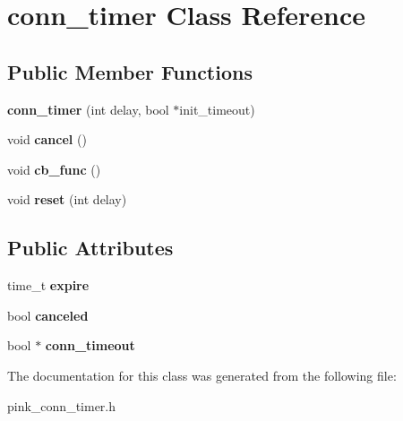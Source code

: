 \hypertarget{classconn__timer}{}\section{conn\+\_\+timer Class Reference}
\label{classconn__timer}
\subsection*{Public Member Functions}
\begin{DoxyCompactItemize}
\item 
\mbox{\label{classconn__timer_a1f4ceab01f4274ab66147f4bb9fec535}} 
{\bfseries conn\+\_\+timer} (int delay, bool $\ast$init\+\_\+timeout)
\item 
\mbox{\label{classconn__timer_a543102358beb1bc590006310556182de}} 
void {\bfseries cancel} ()
\item 
\mbox{\label{classconn__timer_a86d7a0d33b7423368bba281a0d0eaab9}} 
void {\bfseries cb\+\_\+func} ()
\item 
\mbox{\label{classconn__timer_a6cb5ef510c4022acd31b002e15758d60}} 
void {\bfseries reset} (int delay)
\end{DoxyCompactItemize}
\subsection*{Public Attributes}
\begin{DoxyCompactItemize}
\item 
\mbox{\label{classconn__timer_a2c71b17e51d75dc27a4e0f1f7e443ec5}} 
time\+\_\+t {\bfseries expire}
\item 
\mbox{\label{classconn__timer_a51dd2abd61d07bd63c37551404851bf5}} 
bool {\bfseries canceled}
\item 
\mbox{\label{classconn__timer_a0f3fbb63bdf0764fffe4b5fd0fedc3db}} 
bool $\ast$ {\bfseries conn\+\_\+timeout}
\end{DoxyCompactItemize}


The documentation for this class was generated from the following file\+:\begin{DoxyCompactItemize}
\item 
pink\+\_\+conn\+\_\+timer.\+h\end{DoxyCompactItemize}
